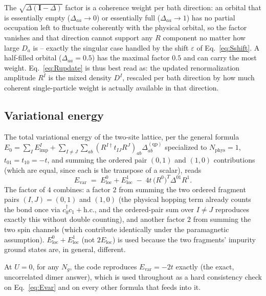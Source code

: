 \documentclass[11pt]{article}
\newcommand{\Nphys}{N_{\mathrm{phys}}}
\newcommand{\Ng}{N_{g}}
\begin{document}
The $\sqrt{\Delta(\mathbf{I}-\Delta)}$ factor is a coherence weight per bath
direction: an orbital that is essentially empty ($\Delta_{aa}\to0$) or
essentially full ($\Delta_{aa}\to1$) has no partial occupation left to
fluctuate coherently with the physical orbital, so the factor vanishes and
that direction cannot support any $R$ component no matter how large $D_a$
is -- exactly the singular case handled by the shift $\varepsilon$ of
Eq.~\eqref{eq:Sshift}. A half-filled orbital
($\Delta_{aa}=0.5$) has the maximal factor $0.5$ and can carry the most
weight. Eq.~\eqref{eq:Rupdate} is thus best read as: the updated
renormalization amplitude $R^{I}$ is the mixed density $D^I$, rescaled
per bath direction by how much coherent single-particle weight is actually
available in that direction.

\subsection{Variational energy}
\label{sec:energy}

The total variational energy of the two-site lattice, per the general
formula $E_0=\sum_I E^{I}_{\mathrm{imp}} + \sum_{I\neq J}\sum_{ab}
(R^{I\dagger}t_{IJ}R^{J})_{ab}\Delta^{(\mathrm{qp})}_{ab}$ specialized to
$\Nphys=1$, $t_{01}=t_{10}=-t$, and summing the ordered pair $(0,1)$ and
$(1,0)$ contributions (which are equal, since each is the transpose of a
scalar), reads
\begin{equation}
  \boxed{\;
  E_{\mathrm{var}} \;=\; E^{0}_{\mathrm{loc}} + E^{1}_{\mathrm{loc}}
    \;-\; 4t\,\bigl(R^{0}\bigr)^{T}\Delta^{01}R^{1}.
  \;}
  \label{eq:Evar}
\end{equation}
The factor of $4$ combines: a factor $2$ from summing the two ordered
fragment pairs $(I,J)=(0,1)$ and $(1,0)$ (the physical hopping term already
counts the bond once via $c^\dagger_0c_1+\mathrm{h.c.}$, and the ordered-pair
sum over $I\neq J$ reproduces exactly this without double counting), and
another factor $2$ from summing the two spin channels (which contribute
identically under the paramagnetic assumption). $E^{0}_{\mathrm{loc}}+E^{1}_{\mathrm{loc}}$
(not $2E_{\mathrm{loc}}$) is used because the two fragments' impurity
ground states are, in general, different.

At $U=0$, for any $\Ng$, the code reproduces $E_{\mathrm{var}}=-2t$ exactly
(the exact, uncorrelated dimer answer), which is used throughout as a hard
consistency check on Eq.~\eqref{eq:Evar} and on every other formula that
feeds into it.
\end{document}
